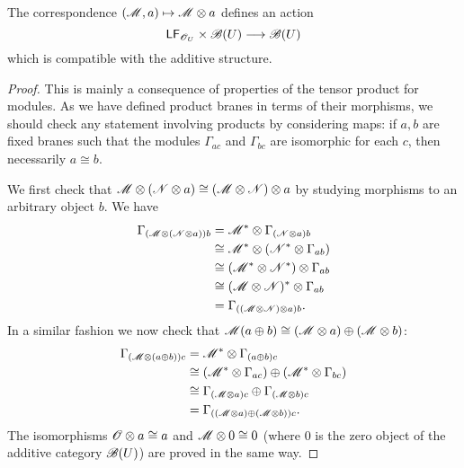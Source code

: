 \begin{proposition}
The correspondence $(\mathscr{M},a)\mapsto \mathscr{M}\otimes a$ defines an action
$$\mathsf{LF}_{\mathscr{O}_U}\times \mathscr{B}(U)\longrightarrow \mathscr{B}(U)$$
which is compatible with the additive structure.
\end{proposition}
\begin{proof}
This is mainly a consequence of properties of the tensor product for modules. As we have defined product branes in terms of their morphisms, we should check any statement involving products by considering maps: if $a,b$ are fixed branes such that the modules $\Gamma_{ac}$ and $\Gamma_{bc}$ are isomorphic for each $c$, then necessarily $a\cong b$.

We first check that $\mathscr{M}\otimes (\mathscr{N}\otimes a)\cong (\mathscr{M}\otimes \mathscr{N})\otimes a$ by studying morphisms to an arbitrary object $b$. We have
$$
\begin{aligned}
\Gamma_{(\mathscr{M}\otimes (\mathscr{N}\otimes a))b} &= \mathscr{M}^*\otimes \Gamma_{(\mathscr{N}\otimes a)b} \\
																							&\cong \mathscr{M}^*\otimes \left (\mathscr{N}^*\otimes \Gamma_{ab}\right ) \\
																							&\cong \left (\mathscr{M}^*\otimes \mathscr{N}^*\right )\otimes \Gamma_{ab} \\
																							&\cong (\mathscr{M}\otimes \mathscr{N})^*\otimes \Gamma_{ab} \\
																							&= \Gamma_{((\mathscr{M}\otimes \mathscr{N})\otimes a)b}. \\
\end{aligned}
$$
In a similar fashion we now check that $\mathscr{M}(a\oplus b)\cong (\mathscr{M}\otimes a)\oplus (\mathscr{M}\otimes b)$:
$$
\begin{aligned}
\Gamma_{(\mathscr{M}\otimes (a\oplus b))c} &= \mathscr{M}^*\otimes \Gamma_{(a\oplus b)c} \\
																			 &\cong (\mathscr{M}^*\otimes \Gamma_{ac})\oplus (\mathscr{M}^*\otimes \Gamma_{bc}) \\
																			 &\cong \Gamma_{(\mathscr{M}\otimes a)c}\oplus \Gamma_{(\mathscr{M}\otimes b)c} \\
																			 &= \Gamma_{((\mathscr{M}\otimes a)\oplus (\mathscr{M}\otimes b))c}.\\
\end{aligned}
$$
The isomorphisms $\mathscr{O}\otimes a\cong a$ and $\mathscr{M}\otimes 0\cong 0$ (where $0$ is the zero object of the additive category $\mathscr{B}(U)$) are proved in the same way.
\end{proof}

